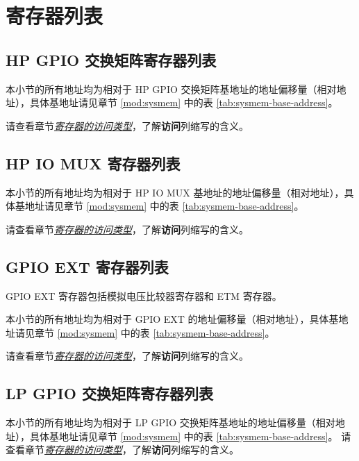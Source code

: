 \documentclass[main\_\_CN.tex]{subfiles}
\begin{document}
\hypertarget{iomuxgpio-reg-summ}{}
\section{寄存器列表}
\subsection{HP GPIO 交换矩阵寄存器列表}
\label{sec:hp-gpio-reg-summ}
本小节的所有地址均为相对于 HP GPIO 交换矩阵基地址的地址偏移量（相对地址），具体基地址请见章节 \ref{mod:sysmem} \textit{} 中的表 \ref{tab:sysmem-base-address}。

请查看章节\hyperref[glossary-access-types]{\textit{寄存器的访问类型}}，了解\textbf{访问}列缩写的含义。



\subsection{HP IO MUX 寄存器列表}
本小节的所有地址均为相对于 HP IO MUX 基地址的地址偏移量（相对地址），具体基地址请见章节 \ref{mod:sysmem} \textit{} 中的表 \ref{tab:sysmem-base-address}。

请查看章节\hyperref[glossary-access-types]{\textit{寄存器的访问类型}}，了解\textbf{访问}列缩写的含义。



\subsection{GPIO EXT 寄存器列表}
GPIO EXT 寄存器包括模拟电压比较器寄存器和 ETM 寄存器。

本小节的所有地址均为相对于 GPIO EXT 的地址偏移量（相对地址），具体基地址请见章节 \ref{mod:sysmem} \textit{} 中的表 \ref{tab:sysmem-base-address}。

请查看章节\hyperref[glossary-access-types]{\textit{寄存器的访问类型}}，了解\textbf{访问}列缩写的含义。



\subsection{LP GPIO 交换矩阵寄存器列表}
\label{sec:lp-gpio-register-summ}

本小节的所有地址均为相对于 LP GPIO 交换矩阵基地址的地址偏移量（相对地址），具体基地址请见章节 \ref{mod:sysmem} \textit{} 中的表 \ref{tab:sysmem-base-address}。
请查看章节\hyperref[glossary-access-types]{\textit{寄存器的访问类型}}，了解\textbf{访问}列缩写的含义。
\end{document}
